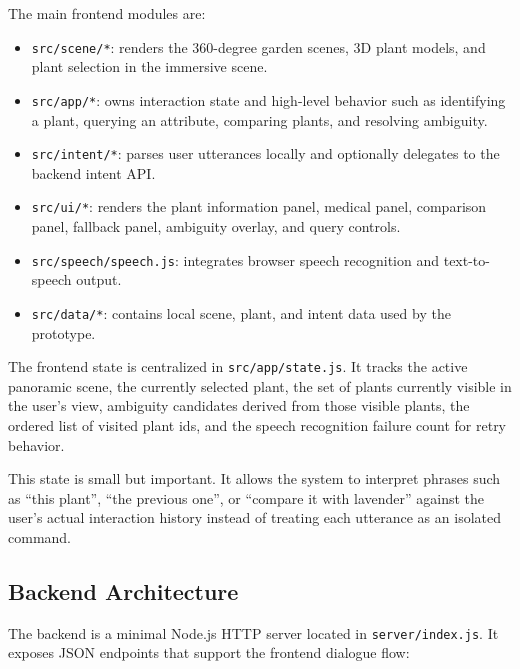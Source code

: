 \documentclass[12pt,a4paper]{article}
\begin{document}
The main frontend modules are:

\begin{itemize}
    \item \texttt{src/scene/*}: renders the 360-degree garden scenes, 3D plant
    models, and plant selection in the immersive scene.

    \item \texttt{src/app/*}: owns interaction state and high-level behavior
    such as identifying a plant, querying an attribute, comparing plants, and
    resolving ambiguity.

    \item \texttt{src/intent/*}: parses user utterances locally and optionally
    delegates to the backend intent API.

    \item \texttt{src/ui/*}: renders the plant information panel, medical panel,
    comparison panel, fallback panel, ambiguity overlay, and query controls.

    \item \texttt{src/speech/speech.js}: integrates browser speech recognition
    and text-to-speech output.

    \item \texttt{src/data/*}: contains local scene, plant, and intent data used
    by the prototype.
\end{itemize}

The frontend state is centralized in \texttt{src/app/state.js}. It tracks the
active panoramic scene, the currently selected plant, the set of plants currently
visible in the user's view, ambiguity candidates derived from those visible
plants, the ordered list of visited plant ids, and the speech recognition
failure count for retry behavior.

This state is small but important. It allows the system to interpret phrases
such as ``this plant'', ``the previous one'', or ``compare it with lavender''
against the user's actual interaction history instead of treating each
utterance as an isolated command.

\subsection{Backend Architecture}

The backend is a minimal Node.js HTTP server located in \texttt{server/index.js}.
It exposes JSON endpoints that support the frontend dialogue flow:
\end{document}
